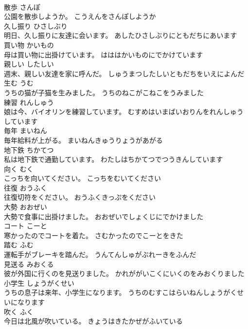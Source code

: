 \documentclass[8pt]{extreport}
\begin{document}
\begin{CJK}{UTF8}{min}
\\	散歩	さんぽ	
\\	公園を散歩しようか。	こうえんをさんぽしようか	
\\	久し振り	ひさしぶり	
\\	明日、久し振りに友達に会います。	あしたひさしぶりにともだちにあいます	
\\	買い物	かいもの	
\\	母は買い物に出掛けています。	はははかいものにでかけています	
\\	親しい	したしい	
\\	週末、親しい友達を家に呼んだ。	しゅうまつしたしいともだちをいえによんだ	
\\	生む	うむ	
\\	うちの猫が子猫を生みました。	うちのねこがこねこをうみました	
\\	練習	れんしゅう	
\\	娘は今、バイオリンを練習しています。	むすめはいまばいおりんをれんしゅうしています	
\\	毎年	まいねん	
\\	毎年給料が上がる。	まいねんきゅうりょうがあがる	
\\	地下鉄	ちかてつ	
\\	私は地下鉄で通勤しています。	わたしはちかてつでつうきんしています	
\\	向く	むく	
\\	こっちを向いてください。	こっちをむいてください	
\\	往復	おうふく	
\\	往復切符をください。	おうふくきっぷをください	
\\	大勢	おおぜい	
\\	大勢で食事に出掛けました。	おおぜいでしょくじにでかけました	
\\	コート	こーと	
\\	寒かったのでコートを着た。	さむかったのでこーとをきた	
\\	踏む	ふむ	
\\	運転手がブレーキを踏んだ。	うんてんしゅがぶれーきをふんだ	
\\	見送る	みおくる	
\\	彼が外国に行くのを見送りました。	かれががいこくにいくのをみおくりました	
\\	小学生	しょうがくせい	
\\	うちの息子は来年、小学生になります。	うちのむすこはらいねんしょうがくせいになります	
\\	吹く	ふく	
\\	今日は北風が吹いている。	きょうはきたかぜがふいている	

\end{CJK}
\end{document}
